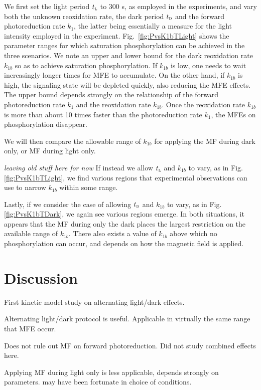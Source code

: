 \documentclass[twoside,twocolumn,9pt]{article}
\begin{document}
We first set the light period $t_{\textsc{l}}$ to 300 s, as employed in the experiments, and vary both the unknown reoxidation rate,
the dark period $t_{\textsc{d}}$ and the forward photoreduction rate $k_{1}$, the latter being essentially a measure for the light
intensity employed in the experiment. Fig.~\ref{fig:PvsK1bTLight} shows the parameter ranges for which saturation phosphorylation
can be achieved in the three scenarios. We note an upper and lower bound for the dark reoxidation rate $k_{1b}$ so as to achieve
saturation phosphorylation. If $k_{1b}$ is low, one needs to wait increasingly longer times for MFE to accumulate. On the other
hand, if $k_{1b}$ is high, the signaling state will be depleted quickly, also reducing the MFE effects. The upper bound depends
strongly on the relationship of the forward photoreduction rate $k_{1}$ and the reoxidation rate $k_{1b}$. Once the reoxidation rate
$k_{1b}$ is more than about 10 times faster than the photoreduction rate $k_{1}$, the MFEs on phosphorylation disappear. 

We will then compare the allowable range of $k_{1b}$ for applying the MF during dark only, or MF during light only.

\emph{leaving old stuff here for now}
If instead we allow $t_{\textsc{l}}$ and $k_{1b}$ to vary, as in Fig.\,\ref{fig:PvsK1bTLight}, we find various regions that
experimental observations can use to narrow $k_{1b}$ within some range.

Lastly, if we consider the case of allowing $t_{\textsc{d}}$ and $k_{1b}$ to vary, as in Fig.\,\ref{fig:PvsK1bTDark}, we again see
various regions emerge. In both situations, it appears that the MF during only the dark places the largest restriction on the
available range of $k_{1b}$. There also exists a value of $k_{1b}$ above which no phosphorylation can occur, and depends on how the
magnetic field is applied.

\section{Discussion}
First kinetic model study on alternating light/dark effects.

Alternating light/dark protocol is useful. Applicable in virtually the same range that MFE occur.

Does not rule out MF on forward photoreduction. Did not study combined effects here.

Applying MF during light only is less applicable, depends strongly on parameters. \cite{Hammad2019} may have been fortunate in
choice of conditions.
\end{document}
